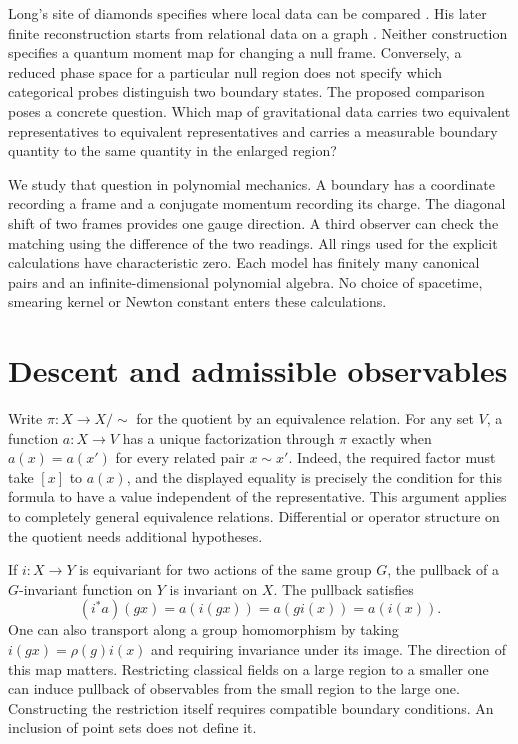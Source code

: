 \documentclass[11pt,letterpaper]{article}
\begin{document}
Long's site of diamonds specifies where local data can be compared \cite[Example 4.8]{long}.
His later finite reconstruction starts from relational data on a graph \cite{rep}. Neither
construction specifies a quantum moment map for changing a null frame. Conversely, a reduced
phase space for a particular null region does not specify which categorical probes distinguish
two boundary states. The proposed comparison poses a concrete question. Which map of
gravitational data carries two equivalent representatives to equivalent representatives and
carries a measurable boundary quantity to the same quantity in the enlarged region?

We study that question in polynomial mechanics. A boundary has a coordinate recording a frame
and a conjugate momentum recording its charge. The diagonal shift of two frames provides one
gauge direction. A third observer can check the matching using the difference of the two
readings. All rings used for the explicit calculations have characteristic zero. Each model
has finitely many canonical pairs and an infinite-dimensional polynomial algebra. No choice of
spacetime, smearing kernel or Newton constant enters these calculations.

\section{Descent and admissible observables}
Write $\pi:X\to X/{\sim}$ for the quotient by an equivalence relation. For any set $V$, a
function $a:X\to V$ has a unique factorization through $\pi$ exactly when $a(x)=a(x')$ for
every related pair $x\sim x'$. Indeed, the required factor must take $[x]$ to $a(x)$, and the
displayed equality is precisely the condition for this formula to have a value independent of
the representative. This argument applies to completely general equivalence relations.
Differential or operator structure on the quotient needs additional hypotheses.

If $i:X\to Y$ is equivariant for two actions of the same group $G$, the pullback of a
$G$-invariant function on $Y$ is invariant on $X$. The pullback satisfies
\[
 (i^*a)(gx)=a(i(gx))=a(gi(x))=a(i(x)).
\]
One can also transport along a group homomorphism by taking $i(gx)=\rho(g)i(x)$ and requiring
invariance under its image. The direction of this map matters. Restricting classical fields on
a large region to a smaller one can induce pullback of observables from the small region to
the large one. Constructing the restriction itself requires compatible boundary conditions. An
inclusion of point sets does not define it.
\end{document}
